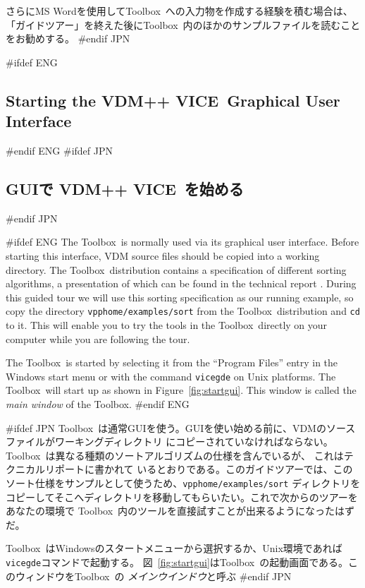 \documentclass[\pformat,12pt]{article}
\newcommand{\vdmslpp}{VDM-SL}
\newcommand{\Toolbox}{Toolbox}
\newcommand{\vdmgde}{vdmgde}
\newcommand{\vdmhome}{vdmhome}
\newcommand{\vdmslpp}{VDM++}
\newcommand{\Toolbox}{Toolbox}
\newcommand{\vdmgde}{vppgde}
\newcommand{\vdmhome}{vpphome}
\renewcommand{\vdmslpp}{VDM++ VICE}
\renewcommand{\vdmgde}{vicegde}
\renewcommand{\vdmhome}{vpphome}
\begin{document}
さらにMS Wordを使用して\Toolbox\ への入力物を作成する経験を積む場合は、
「ガイドツアー」を終えた後に\Toolbox\ 内のほかのサンプルファイルを読むことをお勧めする。
#endif JPN

#ifdef ENG
\subsection{Starting the \vdmslpp\ Graphical User Interface} 
#endif ENG
#ifdef JPN
\subsection{GUIで \vdmslpp\ を始める} 
#endif JPN

#ifdef ENG
The \Toolbox\ is normally used via its graphical user interface. Before
starting this interface, VDM source files should be copied into a
working directory. The \Toolbox\ distribution contains a specification
of different sorting algorithms, a presentation of which can be found
in the technical report
.  During
this guided tour we will use this sorting specification as our running
example, so copy the directory {\tt \vdmhome/examples/sort} from the
\Toolbox\ distribution and {\tt cd} to it.  This will enable you to
try the tools in the \Toolbox\ directly on your computer while you are
following the tour.

The \Toolbox\ is started by selecting it from the ``Program Files''
entry in the Windows start menu or with the command {\tt \vdmgde}
 on Unix platforms. The \Toolbox\ 
will start up as shown in Figure~\ref{fig:startgui}. This window is
called the {\em main window\/} of the \Toolbox.
#endif ENG

#ifdef JPN
\Toolbox\ は通常GUIを使う。GUIを使い始める前に、VDMのソースファイルがワーキングディレクトリ
にコピーされていなければならない。\Toolbox\ は異なる種類のソートアルゴリズムの仕様を含んでいるが、
これはテクニカルリポートに書かれて
いるとおりである。このガイドツアーでは、このソート仕様をサンプルとして使うため、{\tt \vdmhome/examples/sort}
ディレクトリをコピーしてそこへディレクトリを移動してもらいたい。これで次からのツアーをあなたの環境で
\Toolbox\ 内のツールを直接試すことが出来るようになったはずだ。

\Toolbox\ はWindowsのスタートメニューから選択するか、Unix環境であれば{\tt
  \vdmgde}コマンドで起動する。
図~\ref{fig:startgui}は\Toolbox\ の起動画面である。このウィンドウを\Toolbox\ の
{\em メインウインドウ\/}と呼ぶ
#endif JPN
\end{document}
